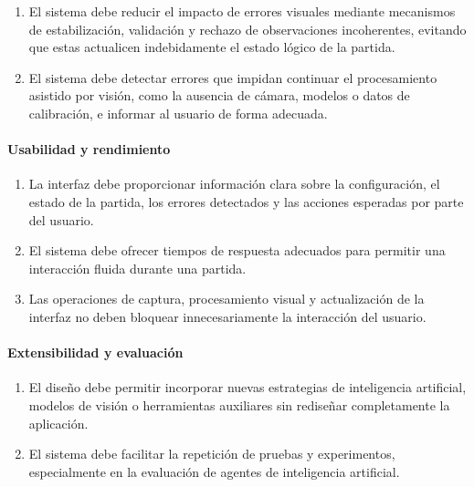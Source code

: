 \begin{enumerate}[label=\textbf{RNF-\twodigits*:}, leftmargin=2.5cm, resume]
    \item El sistema debe reducir el impacto de errores visuales mediante mecanismos de estabilización, validación y rechazo de observaciones incoherentes, evitando que estas actualicen indebidamente el estado lógico de la partida.

    \item El sistema debe detectar errores que impidan continuar el procesamiento asistido por visión, como la ausencia de cámara, modelos o datos de calibración, e informar al usuario de forma adecuada.
\end{enumerate}

\paragraph{Usabilidad y rendimiento}

\begin{enumerate}[label=\textbf{RNF-\twodigits*:}, leftmargin=2.5cm, resume]
    \item La interfaz debe proporcionar información clara sobre la configuración, el estado de la partida, los errores detectados y las acciones esperadas por parte del usuario.

    \item El sistema debe ofrecer tiempos de respuesta adecuados para permitir una interacción fluida durante una partida.

    \item Las operaciones de captura, procesamiento visual y actualización de la interfaz no deben bloquear innecesariamente la interacción del usuario.
\end{enumerate}

\paragraph{Extensibilidad y evaluación}

\begin{enumerate}[label=\textbf{RNF-\twodigits*:}, leftmargin=2.5cm, resume]
    \item El diseño debe permitir incorporar nuevas estrategias de inteligencia artificial, modelos de visión o herramientas auxiliares sin rediseñar completamente la aplicación.

    \item El sistema debe facilitar la repetición de pruebas y experimentos, especialmente en la evaluación de agentes de inteligencia artificial.
\end{enumerate}


